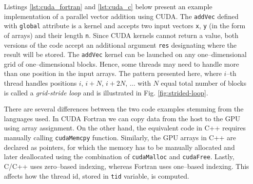 \begin{example}
Listings \ref{lst:cuda_fortran} and \ref{lst:cuda_c} below present an example implementation of a
parallel vector addition using CUDA. The \texttt{addVec} defined with \texttt{global} attribute is a
kernel and accepts two input vectors \texttt{x}, \texttt{y} (in the form of arrays) and their length
\texttt{n}. Since CUDA kernels cannot return a value, both versions of the code accept an additional
argument \texttt{res} designating where the result will be stored. The \texttt{addVec} kernel can be
launched on any one--dimensional grid of one--dimensional blocks. Hence, some threads may need to
handle more than one position in the input arrays. The pattern presented here, where $i$--th thread
handles positions $i$, $i+N$, $i+2N$, $\ldots$ with $N$ equal total number of blocks is called a
\emph{grid-stride loop} and is illustrated in Fig. \ref{fig:strided-loop}.

There are several differences between the two code examples stemming from the languages used. In
CUDA Fortran we can copy data from the host to the GPU using array assignment. On
the other hand, the equivalent code in C++ requires manually calling \texttt{cudaMemcpy} function.
Similarly, the GPU arrays in C++ are declared as pointers, for which the memory has to be manually
allocated and later deallocated using the combination of \texttt{cudaMalloc} and \texttt{cudaFree}.
Lastly, C/C++ uses zero--based indexing, whereas Fortran uses one--based indexing.
This affects how the thread id, stored in \texttt{tid} variable, is computed.







\end{example}
